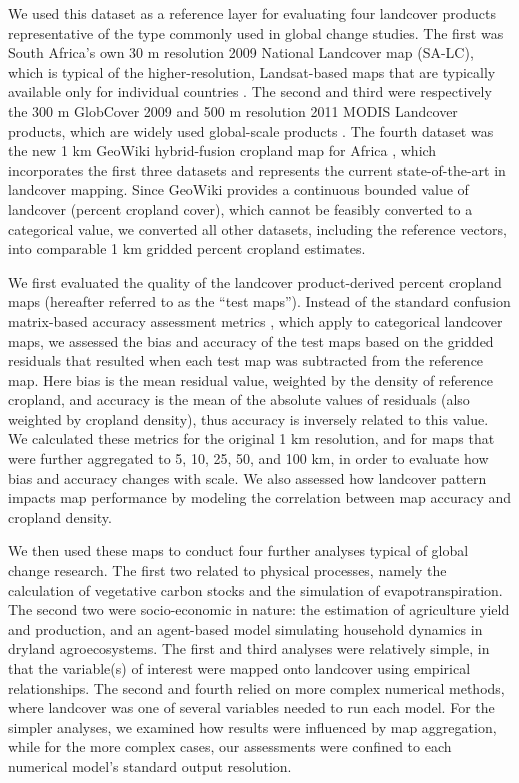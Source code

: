 \documentclass{pnastwo2}
\begin{document}
\begin{article}
We used this dataset as a reference layer for evaluating four landcover products representative of the type commonly used in global change studies. The first was South Africa's own 30 m resolution 2009 National Landcover map (SA-LC)\cite{sanbi_national_2009}, which is typical of the higher-resolution, Landsat-based maps that are typically available only for individual countries \cite[e.g.][]{fry_completion_2009}. The second and third were respectively the 300 m GlobCover 2009 \cite{arino_global_2012} and 500 m resolution 2011 MODIS Landcover products, which are widely used global-scale products \cite[e.g.][]{gross_monitoring_2013, shackelford_conservation_2015}. The fourth dataset was the new 1 km GeoWiki hybrid-fusion cropland map for Africa \cite{fritz_mapping_2015}, which incorporates the first three datasets and represents the current state-of-the-art in landcover mapping.  Since GeoWiki provides a continuous bounded value of landcover (percent cropland cover), which cannot be feasibly converted to a categorical value, we converted all other datasets, including the reference vectors, into comparable 1 km gridded percent cropland estimates. 

We first evaluated the quality of the landcover product-derived percent cropland maps (hereafter referred to as the ``test maps''). Instead of the standard confusion matrix-based accuracy assessment metrics \cite{olofsson_good_2014,olofsson_making_2013}, which apply to categorical landcover maps, we assessed the bias and accuracy of the test maps based on the gridded residuals that resulted when each test map was subtracted from the reference map. Here bias is the mean residual value, weighted by the density of reference cropland, and accuracy is the mean of the absolute values of residuals (also weighted by cropland density), thus accuracy is inversely related to this value. We calculated these metrics for the original 1 km resolution, and for maps that were further aggregated to 5, 10, 25, 50, and 100 km, in order to evaluate how bias and accuracy changes with scale. We also assessed how landcover pattern impacts map performance by modeling the correlation between map accuracy and cropland density.  

We then used these maps to conduct four further analyses typical of global change research. The first two related to physical processes, namely the calculation of vegetative carbon stocks and the simulation of evapotranspiration. The second two were socio-economic in nature: the estimation of agriculture yield and production, and an agent-based model simulating household dynamics in dryland agroecosystems.  The first and third analyses were relatively simple, in that the variable(s) of interest were mapped onto landcover using empirical relationships. The second and fourth relied on more complex numerical methods, where landcover was one of several variables needed to run each model. For the simpler analyses, we examined how results were influenced by map aggregation, while for the more complex cases, our assessments were confined to each numerical model's standard output resolution. 


\end{article}
\end{document}
